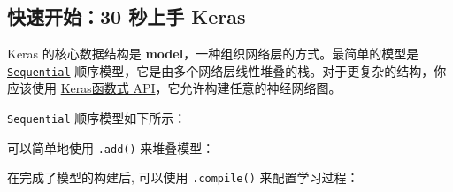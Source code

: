 \subsection{快速开始：30 秒上手
Keras}\label{ux5febux901fux5f00ux59cb30-ux79d2ux4e0aux624b-keras}

Keras 的核心数据结构是
\textbf{model}，一种组织网络层的方式。最简单的模型是
\hyperref[sequential-model-guide]{\texttt{Sequential}}
顺序模型，它是由多个网络层线性堆叠的栈。对于更复杂的结构，你应该使用
\hyperref[functional-api-guide]{Keras函数式 API}，它允许构建任意的神经网络图。

\texttt{Sequential} 顺序模型如下所示：

\begin{Shaded}
\begin{Highlighting}[]
  

\OperatorTok{=} 
\end{Highlighting}
\end{Shaded}

可以简单地使用 \texttt{.add()} 来堆叠模型：

\begin{Shaded}
\begin{Highlighting}[]
  

\OperatorTok{=}\OperatorTok{=}\OperatorTok{=}\NormalTok{))}
\OperatorTok{=}\OperatorTok{=}\NormalTok{))}
\end{Highlighting}
\end{Shaded}

在完成了模型的构建后, 可以使用 \texttt{.compile()} 来配置学习过程：

\begin{Shaded}
\begin{Highlighting}[]
\OperatorTok{=}\NormalTok{,}
              \OperatorTok{=}\NormalTok{,}
              \OperatorTok{=}\NormalTok{[}\NormalTok{])}
\end{Highlighting}
\end{Shaded}

